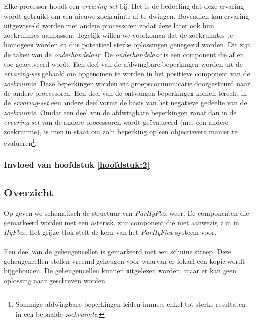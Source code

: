 Elke processor houdt een \emph{ervaring-set} bij. Het is de bedoeling dat deze ervaring wordt gebruikt om een nieuwe zoekruimte af te dwingen. Bovendien kan ervaring uitgewisseld worden met andere processoren zodat deze later ook hun zoekruimtes aanpassen. Tegelijk willen we voorkomen dat de zoekruimtes te homogeen worden en dus potentieel sterke oplossingen genegeerd worden. Dit zijn de taken van de \emph{onderhandelaar}. De \emph{onderhandelaar} is een component die af en toe geactiveerd wordt. Een deel van de afdwingbare beperkingen worden uit de \emph{ervaring-set} gehaald om opgenomen te worden in het positieve component van de \emph{zoekruimte}. Deze beperkingen worden via groepscommunicatie doorgestuurd naar de andere processoren. Een deel van de ontvangen beperkingen komen terecht in de \emph{ervaring-set} een andere deel vormt de basis van het negatieve gedeelte van de \emph{zoekruimte}. Omdat een deel van de afdwingbare beperkingen vanaf dan in de \emph{ervaring-set} van de andere processoren wordt ge\"evalueerd (met een andere zoekruimte), is men in staat om zo'n beperking op een objectievere manier te evalueren\footnote{Sommige afdwingbare beperkingen leiden immers enkel tot sterke resultaten in een bepaalde \emph{zoekruimte}.}.

\subsubsection{Invloed van hoofdstuk \ref{hoofdstuk:2}}

\subsection{Overzicht}

Op  geven we schematisch de structuur van \emph{ParHyFlex} weer.	De componenten die gemarkeerd worden met een asterisk, zijn component die niet aanwezig zijn in \emph{HyFlex}. Het grijze blok stelt de kern van het \emph{ParHyFlex} systeem voor.%

\paragraph{}
Een deel van de geheugencellen is gemarkeerd met een schuine streep. Deze geheugencellen stellen vreemd geheugen voor waarvan er lokaal een kopie wordt bijgehouden. De geheugencellen kunnen uitgelezen worden, maar er kan geen oplossing naar geschreven worden.

